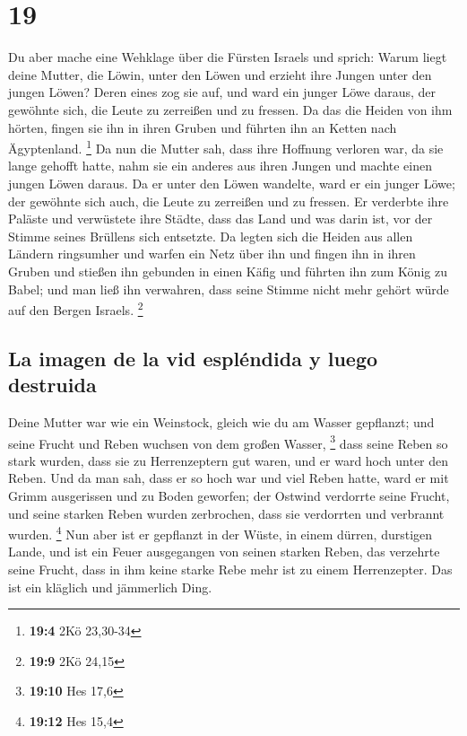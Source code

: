 \hypertarget{section-18}{%
\section{19}\label{section-18}}

 Du aber mache eine Wehklage über die Fürsten Israels
 und sprich: Warum liegt deine Mutter, die Löwin, unter
den Löwen und erzieht ihre Jungen unter den jungen Löwen? 
Deren eines zog sie auf, und ward ein junger Löwe daraus, der gewöhnte
sich, die Leute zu zerreißen und zu fressen.  Da das die
Heiden von ihm hörten, fingen sie ihn in ihren Gruben und führten ihn an
Ketten nach Ägyptenland. \footnote{\textbf{19:4} 2Kö 23,30-34}
 Da nun die Mutter sah, dass ihre Hoffnung verloren war,
da sie lange gehofft hatte, nahm sie ein anderes aus ihren Jungen und
machte einen jungen Löwen daraus.  Da er unter den Löwen
wandelte, ward er ein junger Löwe; der gewöhnte sich auch, die Leute zu
zerreißen und zu fressen.  Er verderbte ihre Paläste und
verwüstete ihre Städte, dass das Land und was darin ist, vor der Stimme
seines Brüllens sich entsetzte.  Da legten sich die Heiden
aus allen Ländern ringsumher und warfen ein Netz über ihn und fingen ihn
in ihren Gruben  und stießen ihn gebunden in einen Käfig
und führten ihn zum König zu Babel; und man ließ ihn verwahren, dass
seine Stimme nicht mehr gehört würde auf den Bergen Israels. \footnote{\textbf{19:9}
  2Kö 24,15}

\hypertarget{la-imagen-de-la-vid-espluxe9ndida-y-luego-destruida}{%
\subsection{La imagen de la vid espléndida y luego
destruida}\label{la-imagen-de-la-vid-espluxe9ndida-y-luego-destruida}}

 Deine Mutter war wie ein Weinstock, gleich wie du am
Wasser gepflanzt; und seine Frucht und Reben wuchsen von dem großen
Wasser, \footnote{\textbf{19:10} Hes 17,6}  dass seine
Reben so stark wurden, dass sie zu Herrenzeptern gut waren, und er ward
hoch unter den Reben. Und da man sah, dass er so hoch war und viel Reben
hatte,  ward er mit Grimm ausgerissen und zu Boden
geworfen; der Ostwind verdorrte seine Frucht, und seine starken Reben
wurden zerbrochen, dass sie verdorrten und verbrannt wurden. \footnote{\textbf{19:12}
  Hes 15,4}  Nun aber ist er gepflanzt in der Wüste, in
einem dürren, durstigen Lande,  und ist ein Feuer
ausgegangen von seinen starken Reben, das verzehrte seine Frucht, dass
in ihm keine starke Rebe mehr ist zu einem Herrenzepter. Das ist ein
kläglich und jämmerlich Ding.

